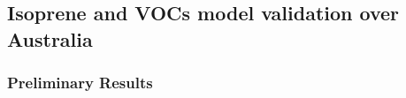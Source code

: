 \subsection{Isoprene and VOCs model validation over Australia}

\subsubsection{Preliminary Results}
